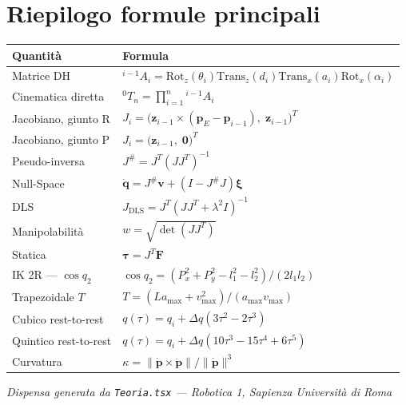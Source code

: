 \documentclass[11pt, a4paper]{article}
\newcommand{\Rot}{\mathrm{Rot}}
\newcommand{\Trans}{\mathrm{Trans}}
\begin{document}
\appendix
\section{Riepilogo formule principali}

\renewcommand{\arraystretch}{1.7}
\begin{center}
\begin{tabular}{ll}
\toprule
\textbf{Quantità} & \textbf{Formula}\\
\midrule
Matrice DH              & ${}^{i-1}A_i = \Rot_z(\theta_i)\Trans_z(d_i)\Trans_x(a_i)\Rot_x(\alpha_i)$\\
Cinematica diretta      & ${}^0T_n = \prod_{i=1}^n {}^{i-1}A_i$\\
Jacobiano, giunto R     & $J_i = \bigl(\mathbf{z}_{i-1}\times(\mathbf{p}_E-\mathbf{p}_{i-1}),\; \mathbf{z}_{i-1}\bigr)^T$\\
Jacobiano, giunto P     & $J_i = \bigl(\mathbf{z}_{i-1},\; \mathbf{0}\bigr)^T$\\
Pseudo-inversa          & $J^\# = J^T(JJ^T)^{-1}$\\
Null-Space              & $\dot{\mathbf{q}} = J^\#\mathbf{v} + (I - J^\#J)\boldsymbol{\xi}$\\
DLS                     & $J_{\text{DLS}} = J^T(JJ^T + \lambda^2 I)^{-1}$\\
Manipolabilità          & $w = \sqrt{\det(JJ^T)}$\\
Statica                 & $\boldsymbol{\tau} = J^T\mathbf{F}$\\
IK 2R — $\cos q_2$      & $\cos q_2 = (P_x^2+P_y^2-l_1^2-l_2^2)/(2l_1 l_2)$\\
Trapezoidale $T$        & $T = (La_{\max}+v_{\max}^2)/(a_{\max}v_{\max})$\\
Cubico rest-to-rest     & $q(\tau) = q_i + \Delta q(3\tau^2-2\tau^3)$\\
Quintico rest-to-rest   & $q(\tau) = q_i + \Delta q(10\tau^3-15\tau^4+6\tau^5)$\\
Curvatura               & $\kappa = \|\dot{\mathbf{p}}\times\ddot{\mathbf{p}}\|/\|\dot{\mathbf{p}}\|^3$\\
\bottomrule
\end{tabular}
\end{center}

\vfill
\begin{center}
  \small\textit{Dispensa generata da \texttt{Teoria.tsx} --- Robotica 1, Sapienza Università di Roma}
\end{center}
\end{document}
